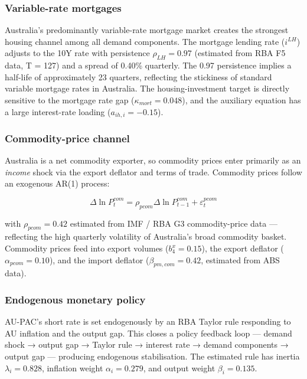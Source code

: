 \documentclass[
]{article}
\begin{document}
\subsubsection{Variable-rate mortgages}\label{variable-rate-mortgages}

Australia's predominantly variable-rate mortgage market creates the
strongest housing channel among all demand components. The mortgage
lending rate (\(i^{LH}\)) adjusts to the 10Y rate with persistence
\(\rho_{LH} = 0.97\) (estimated from RBA F5 data, T = 127) and a spread
of 0.40\% quarterly. The 0.97 persistence implies a half-life of
approximately 23 quarters, reflecting the stickiness of standard
variable mortgage rates in Australia. The housing-investment target is
directly sensitive to the mortgage rate gap (\(\kappa_{mort} = 0.048\)),
and the auxiliary equation has a large interest-rate loading
(\(a_{ih,i} = -0.15\)).

\subsubsection{Commodity-price channel}\label{commodity-price-channel}

Australia is a net commodity exporter, so commodity prices enter
primarily as an \emph{income} shock via the export deflator and terms of
trade. Commodity prices follow an exogenous AR(1) process:

\[\Delta \ln P^{com}_t = \rho_{pcom} \Delta \ln P^{com}_{t-1} + \varepsilon^{pcom}_t\]

with \(\rho_{pcom} = 0.42\) estimated from IMF / RBA G3 commodity-price
data --- reflecting the high quarterly volatility of Australia's broad
commodity basket. Commodity prices feed into export volumes
(\(b^x_4 = 0.15\)), the export deflator (\(\alpha_{pcom} = 0.10\)), and
the import deflator (\(\beta_{pm,com} = 0.42\), estimated from ABS
data).

\subsubsection{Endogenous monetary
policy}\label{endogenous-monetary-policy}

AU-PAC's short rate is set endogenously by an RBA Taylor rule responding
to AU inflation and the output gap. This closes a policy feedback loop
--- demand shock → output gap → Taylor rule → interest rate → demand
components → output gap --- producing endogenous stabilisation. The
estimated rule has inertia \(\lambda_i = 0.828\), inflation weight
\(\alpha_i = 0.279\), and output weight \(\beta_i = 0.135\).
\end{document}
